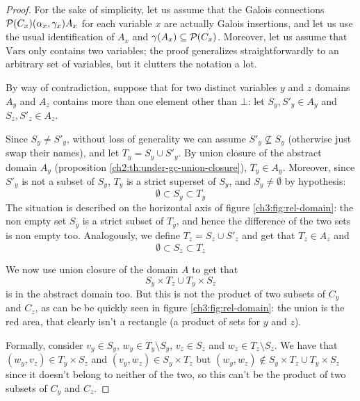\begin{proof}
	For the sake of simplicity, let us assume that the Galois connections $\mathcal{P}(C_x) (\alpha_x, \gamma_x) A_x$ for each variable $x$ are actually Galois insertions, and let us use the usual identification of $A_x$ and $\gamma(A_x) \subseteq \mathcal{P}(C_x)$.
	Moreover, let us assume that $\text{Vars}$ only contains two variables; the proof generalizes straightforwardly to an arbitrary set of variables, but it clutters the notation a lot.

	By way of contradiction, suppose that for two distinct variables $y$ and $z$ domains $A_y$ and $A_z$ contains more than one element other than $\bot$: let $S_y, S'_y \in A_y$ and $S_z, S'_z \in A_z$.

	Since $S_y \neq S'_y$, without loss of generality we can assume $S'_y \nsubseteq S_y$ (otherwise just swap their names), and let $T_y = S_y \cup S'_y$. By union closure of the abstract domain $A_y$ (proposition \ref{ch2:th:under-gc-union-closure}), $T_y \in A_y$. Moreover, since $S'_y$ is not a subset of $S_y$, $T_y$ is a strict superset of $S_y$, and $S_y \neq \emptyset$ by hypothesis:
	\[
	\emptyset \subset S_y \subset T_y
	\]
	The situation is described on the horizontal axis of figure \ref{ch3:fig:rel-domain}: the non empty set $S_y$ is a strict subset of $T_y$, and hence the difference of the two sets is non empty too.
	Analogously, we define $T_z = S_z \cup S'_z$ and get that $T_z \in A_z$ and
	\[
	\emptyset \subset S_z \subset T_z
	\]

	We now use union closure of the domain $A$ to get that
	\[
	S_y \times T_z \cup T_y \times S_z
	\]
	is in the abstract domain too. But this is not the product of two subsets of $C_y$ and $C_z$, as can be be quickly seen in figure \ref{ch3:fig:rel-domain}: the union is the red area, that clearly isn't a rectangle (a product of sets for $y$ and $z$).

	Formally, consider $v_y \in S_y$, $w_y \in T_y \setminus S_y$, $v_z \in S_z$ and $w_z \in T_z \setminus S_z$. We have that $(w_y, v_z) \in T_y \times S_z$ and $(v_y, w_z) \in S_y \times T_z$ but $(w_y, w_z) \notin S_y \times T_z \cup T_y \times S_z$ since it doesn't belong to neither of the two, so this can't be the product of two subsets of $C_y$ and $C_z$.
\end{proof}

